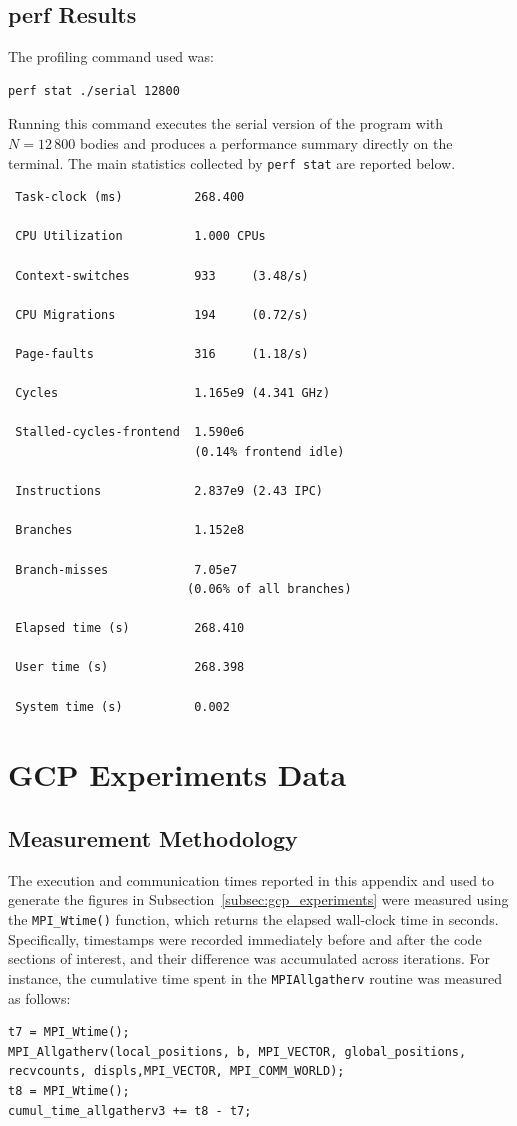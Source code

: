\documentclass{article}
\begin{document}
\subsection{perf Results}
\label{appendix:perf_results}
The profiling command used was:
\begin{verbatim}
perf stat ./serial 12800
\end{verbatim}
Running this command executes the serial version of the program with $N = 12\,800$ bodies and produces a performance summary directly on the terminal.  
The main statistics collected by \texttt{perf stat} are reported below.
\begin{verbatim}
 Task-clock (ms)          268.400
 
 CPU Utilization          1.000 CPUs

 Context-switches         933     (3.48/s)
 
 CPU Migrations           194     (0.72/s)

 Page-faults              316     (1.18/s)

 Cycles                   1.165e9 (4.341 GHz)

 Stalled-cycles-frontend  1.590e6
                          (0.14% frontend idle)

 Instructions             2.837e9 (2.43 IPC)

 Branches                 1.152e8

 Branch-misses            7.05e7
                         (0.06% of all branches)

 Elapsed time (s)         268.410

 User time (s)            268.398

 System time (s)          0.002
\end{verbatim}

\section{GCP Experiments Data}
\label{appendix:gcp_data}
\subsection{Measurement Methodology}
The execution and communication times reported in this appendix and used to generate the figures in Subsection~\ref{subsec:gcp_experiments} were measured using the 
\texttt{MPI\_Wtime()} function, which returns the elapsed wall-clock time in seconds. 
Specifically, timestamps were recorded immediately before and after the code sections of interest, 
and their difference was accumulated across iterations.
For instance, the cumulative time spent in the \texttt{MPI\discretionary{}{}{}Allgatherv} routine was measured as follows:
\begin{lstlisting}
t7 = MPI_Wtime();
MPI_Allgatherv(local_positions, b, MPI_VECTOR, global_positions, recvcounts, displs,MPI_VECTOR, MPI_COMM_WORLD);
t8 = MPI_Wtime();
cumul_time_allgatherv3 += t8 - t7;
\end{lstlisting}
\end{document}
